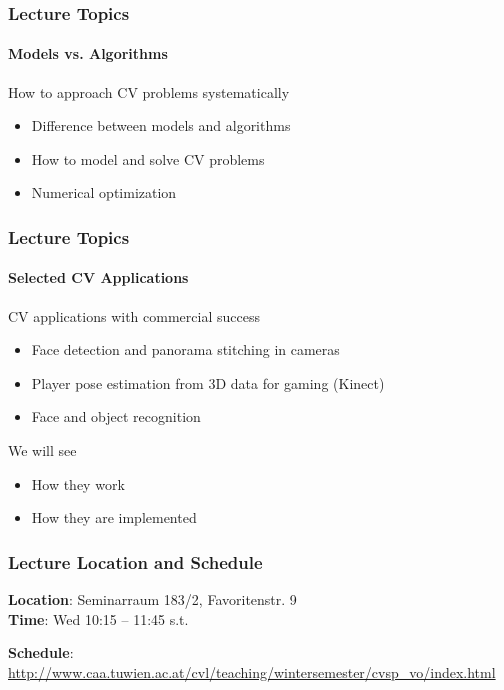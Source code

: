 \documentclass[xetex,professionalfont]{beamer}
\begin{document}

\begin{frame}
\frametitle{Lecture Topics}
\framesubtitle{Models vs. Algorithms}

How to approach CV problems systematically
\begin{itemize}
	\item Difference between models and algorithms
	\item How to model and solve CV problems
	\item Numerical optimization
\end{itemize}

\end{frame}


\begin{frame}
\frametitle{Lecture Topics}
\framesubtitle{Selected CV Applications}

CV applications with commercial success
\begin{itemize}
	\item Face detection and panorama stitching in cameras
	\item Player pose estimation from 3D data for gaming (Kinect)
	\item Face and object recognition
\end{itemize}

\bigskip
We will see
\begin{itemize}
	\item How they work
	\item How they are implemented
\end{itemize}

\end{frame}


\begin{frame}
\frametitle{Lecture Location and Schedule}

\textbf{Location}: Seminarraum 183/2, Favoritenstr. 9\\
\textbf{Time}: Wed 10:15 -- 11:45 s.t.

\bigskip
\textbf{Schedule}: \url{http://www.caa.tuwien.ac.at/cvl/teaching/wintersemester/cvsp_vo/index.html}

\end{frame}
\end{document}
